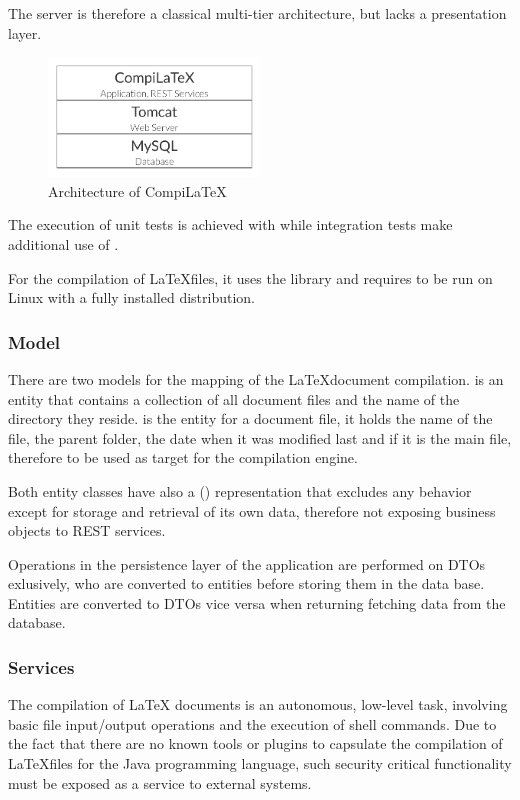 The server is therefore a classical multi-tier architecture, but lacks a presentation layer.

\begin{figure}[H]
	\centering
		\includegraphics[width=0.5\textwidth]{images/compilatex_architecture.pdf}
	\caption{Architecture of CompiLaTeX}
\end{figure}

\pagebreak

The execution of unit tests is achieved with  while integration tests make additional use of .

For the compilation of \LaTeX files, it uses the  library and requires to be run on Linux with a fully installed  distribution.

\subsubsection{Model}
\label{subsubsec:compilatex-model}
There are two models for the mapping of the \LaTeX document compilation.  is an entity that contains a collection of all document files and the name of the directory they reside.  is the entity for a document file, it holds the name of the file, the parent folder, the date when it was modified last and if it is the main file, therefore to be used as target for the compilation engine.

Both entity classes have also a  () representation that excludes any behavior except for storage and retrieval of its own data, therefore not exposing business objects to REST services.

Operations in the persistence layer of the application are performed on DTOs exlusively, who are converted to entities before storing them in the data base. Entities are converted to DTOs vice versa when returning fetching data from the database.

\subsubsection{Services}
\label{subsubsec:compilatex-services}
The compilation of LaTeX documents is an autonomous, low-level task, involving basic file input/output operations and the execution of shell commands. Due to the fact that there are no known tools or plugins to capsulate the compilation of \LaTeX files for the Java programming language, such security critical functionality must be exposed as a service to external systems.

